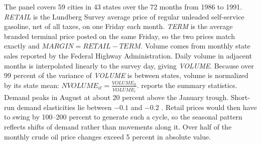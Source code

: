 The panel covers 59 cities in 43 states over the 72 months from 1986 to 1991. \textit{RETAIL} is the Lundberg
Survey average price of regular unleaded self-service gasoline, net of all taxes, on one Friday each month.
\textit{TERM} is the average branded terminal price posted on the same Friday, so the two prices match exactly
and $\textit{MARGIN}=\textit{RETAIL}-\textit{TERM}$. Volume comes from monthly state sales reported by the
Federal Highway Administration. Daily volume in adjacent months is interpolated linearly to the survey day,
giving \textit{VOLUME}. Because over 99 percent of the variance of \textit{VOLUME} is between states,
volume is normalized by its state mean: $\textit{NVOLUME}_{it}=\frac{\textit{VOLUME}_{it}}{\overline{\textit{VOLUME}}_i}$.
 reports the summary statistics. Demand peaks in August at about 20 percent above the
January trough. Short-run demand elasticities lie between $-0.1$ and $-0.2$ \citep{DahlSterner1991}. Retail
prices would then have to swing by 100--200 percent to generate such a cycle, so the seasonal pattern reflects
shifts of demand rather than movements along it. Over half of the monthly crude oil price changes exceed 5
percent in absolute value.

